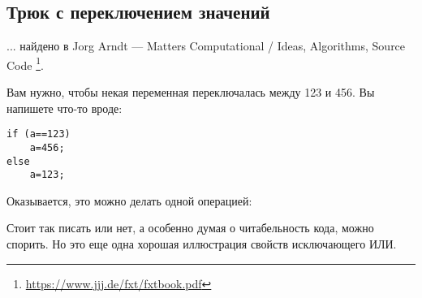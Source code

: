 \subsection{Трюк с переключением значений}

... найдено в Jorg Arndt --- Matters Computational / Ideas, Algorithms, Source Code
\footnote{\url{https://www.jjj.de/fxt/fxtbook.pdf}}.

Вам нужно, чтобы некая переменная переключалась между 123 и 456.
Вы напишете что-то вроде:

\begin{lstlisting}
if (a==123)
    a=456;
else
    a=123;
\end{lstlisting}

Оказывается, это можно делать одной операцией:



Стоит так писать или нет, а особенно думая о читабельность кода, можно спорить.
Но это еще одна хорошая иллюстрация свойств исключающего ИЛИ.

